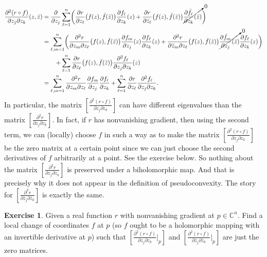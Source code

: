 \documentclass[12pt,openany]{book}
\newcommand{\C}{{\mathbb{C}}}
\theoremstyle{plain}
\theoremstyle{remark}
\theoremstyle{definition}
\newenvironment{exbox}{%
    \def\FrameCommand{\vrule width 1pt \relax\hspace {10pt}}%
    \MakeFramed {\advance \hsize -\width \FrameRestore }%
}{%
    \endMakeFramed
}
\theoremstyle{exercise}
\newtheorem{exercise}{Exercise}[section]
\theoremstyle{example}
\begin{document}
\begin{equation} \label{eq:nonmixedderschangeofcoords}
\begin{split}
\frac{\partial^2 (r \circ f)}{\partial z_j \partial z_k} (z,\bar{z})
& =
\frac{\partial}{\partial z_j }
\sum_{\ell=1}^n 
\biggl(
\frac{\partial r}{\partial z_\ell} \bigl(f(z),\bar{f}(\bar{z})\bigr)
\frac{\partial f_\ell}{\partial z_k} (z) 
+
\frac{\partial r}{\partial \bar{z}_\ell} \bigl(f(z),\bar{f}(\bar{z})\bigr)
\cancelto{0}{\frac{\partial \bar{f}_\ell}{\partial z_k} (\bar{z})}
\biggr)
\\
& =
\sum_{\ell,m=1}^n 
\biggl(
\frac{\partial^2 r}{\partial z_m \partial z_\ell}
\bigl(f(z),\bar{f}(\bar{z})\bigr)
\frac{\partial f_m}{\partial z_j} (z) 
\frac{\partial f_\ell}{\partial z_k} (z) 
+
\frac{\partial^2 r}{\partial \bar{z}_m \partial z_\ell} \bigl(f(z),\bar{f}(\bar{z})\bigr)
\cancelto{0}{\frac{\partial \bar{f}_m}{\partial z_j} (\bar{z}) }
\frac{\partial f_\ell}{\partial z_k} (z) 
\biggr)
\\
& \qquad +
\sum_{\ell=1}^n 
\frac{\partial r}{\partial z_\ell} \bigl(f(z),\bar{f}(\bar{z})\bigr)
\frac{\partial^2 f_\ell}{\partial z_j \partial z_k} (z)
\\
&=
\sum_{\ell,m=1}^n 
\frac{\partial^2 r}{\partial z_m \partial z_\ell}
\frac{\partial f_m}{\partial z_j}
\frac{\partial f_\ell}{\partial z_k}
+
\sum_{\ell=1}^n 
\frac{\partial r}{\partial z_\ell}
\frac{\partial^2 f_\ell}{\partial z_j \partial z_k} .
\end{split}
\end{equation}
In particular, the matrix 
$\left[ \frac{\partial^2 (r \circ f)}{\partial z_j \partial z_k} \right]$
can have different eigenvalues than the matrix
$\left[ \frac{\partial^2 r}{\partial z_j \partial z_k} \right]$.  In fact,
if $r$ has nonvanishing gradient, then
using the second term, we can (locally) choose $f$ in such a way as to make
the matrix
$\left[ \frac{\partial^2 (r \circ f)}{\partial z_j \partial z_k} \right]$
be the zero matrix at a certain point since we can just choose the second
derivatives of $f$ arbitrarily at a point.  See the exercise below.  So nothing about the matrix
$\left[ \frac{\partial^2 r}{\partial z_j \partial z_k} \right]$ is
preserved under a biholomorphic map.  And that is precisely why it does not
appear in the definition of pseudoconvexity.
The story for
$\left[ \frac{\partial^2 r}{\partial \bar{z}_j \partial \bar{z}_k} \right]$ is
exactly the same.

\begin{exbox}
\begin{exercise}
Given a real function $r$ with nonvanishing gradient at $p \in \C^n$.  Find
a local change of coordinates $f$ at $p$ (so $f$ ought to be a holomorphic
mapping with an invertible derivative at $p$) such that 
$\left[ \frac{\partial^2 (r \circ f)}{\partial z_j \partial z_k} \Big|_p \right]$
and
$\left[ \frac{\partial^2 (r \circ f)}{\partial \bar{z}_j \partial \bar{z}_k}
\Big|_p \right]$
are just the zero matrices.
\end{exercise}
\end{exbox}
\end{document}
